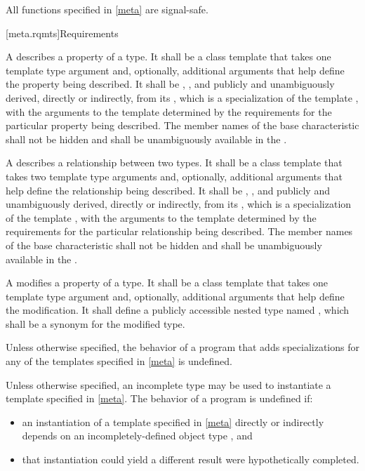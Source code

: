 \pnum
{}%
All functions specified in \ref{meta} are signal-safe.

[meta.rqmts]{Requirements}

\pnum
A  describes a property
of a type. It shall be a class template that takes one template type
argument and, optionally, additional arguments that help define the
property being described. It shall be ,
,
and publicly and unambiguously derived, directly or indirectly, from
its , which is
a specialization of the template
, with
the arguments to the template  determined by the
requirements for the particular property being described.
The member names of the base characteristic shall not be hidden and shall be
unambiguously available in the .

\pnum
A  describes a
relationship between two types. It shall be a class template that
takes two template type arguments and, optionally, additional
arguments that help define the relationship being described. It shall
be , ,
and publicly and unambiguously derived, directly or
indirectly, from
its , which is a specialization
of the template
, with
the arguments to the template  determined by the
requirements for the particular relationship being described.
The member names of the base characteristic shall not be hidden and shall be
unambiguously available in the .

\pnum
A 
modifies a property
of a type. It shall be a class template that takes one
template type argument and, optionally, additional arguments that help
define the modification. It shall define a publicly accessible nested type
named , which shall be a synonym for the modified type.

\pnum
Unless otherwise specified,
the behavior of a program that adds specializations
for any of the templates specified in \ref{meta}
is undefined.

\pnum
Unless otherwise specified, an incomplete type may be used
to instantiate a template specified in \ref{meta}.
The behavior of a program is undefined if:
\begin{itemize}
\item
  an instantiation of a template specified in \ref{meta}
  directly or indirectly depends on
  an incompletely-defined object type , and
\item
  that instantiation could yield a different result
  were  hypothetically completed.
\end{itemize}

